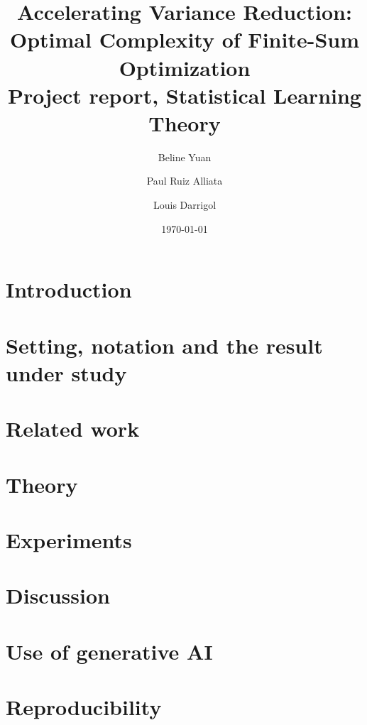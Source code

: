 \documentclass[11pt]{article}
\title{Accelerating Variance Reduction:\\ Optimal Complexity of Finite-Sum Optimization\\[4pt]
\large Project report, Statistical Learning Theory}
\author{Beline Yuan \and Paul Ruiz Alliata \and Louis Darrigol}
\date{\today}
\begin{document}
\maketitle

\begin{abstract}

\end{abstract}

\tableofcontents

\section{Introduction}\label{sec:intro}


\section{Setting, notation and the result under study}\label{sec:setting}


\section{Related work}\label{sec:related}


\section{Theory}\label{sec:theory}







\section{Experiments}\label{sec:experiments}


\section{Discussion}\label{sec:discussion}


\section*{Use of generative AI}





\appendix
\section{Reproducibility}\label{app:repro}

\end{document}
